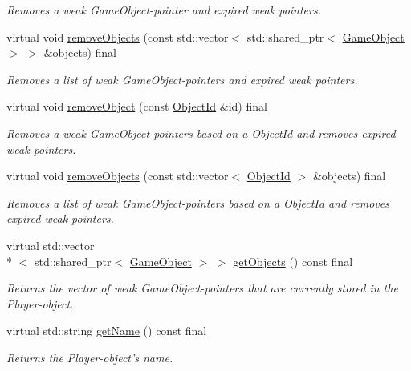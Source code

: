 \begin{DoxyCompactItemize}
\begin{DoxyCompactList}\small\item\em Removes a weak Game\-Object-\/pointer and expired weak pointers. \end{DoxyCompactList}\item 
virtual void \hyperlink{classCourse_1_1PlayerBase_a1ec03fd654d82d9924f77c1a29b80569}{remove\-Objects} (const std\-::vector$<$ std\-::shared\-\_\-ptr$<$ \hyperlink{classCourse_1_1GameObject}{Game\-Object} $>$ $>$ \&objects) final
\begin{DoxyCompactList}\small\item\em Removes a list of weak Game\-Object-\/pointers and expired weak pointers. \end{DoxyCompactList}\item 
virtual void \hyperlink{classCourse_1_1PlayerBase_a98b6f65f5162a34906956852b6382201}{remove\-Object} (const \hyperlink{namespaceCourse_a9a16e743c9813da00109e4991afd2f3e}{Object\-Id} \&id) final
\begin{DoxyCompactList}\small\item\em Removes a weak Game\-Object-\/pointers based on a Object\-Id and removes expired weak pointers. \end{DoxyCompactList}\item 
virtual void \hyperlink{classCourse_1_1PlayerBase_a994b8e326315ed80f18482b32b0d8f3d}{remove\-Objects} (const std\-::vector$<$ \hyperlink{namespaceCourse_a9a16e743c9813da00109e4991afd2f3e}{Object\-Id} $>$ \&objects) final
\begin{DoxyCompactList}\small\item\em Removes a list of weak Game\-Object-\/pointers based on a Object\-Id and removes expired weak pointers. \end{DoxyCompactList}\item 
virtual std\-::vector\\*
$<$ std\-::shared\-\_\-ptr$<$ \hyperlink{classCourse_1_1GameObject}{Game\-Object} $>$ $>$ \hyperlink{classCourse_1_1PlayerBase_ad7ab46149c53b6b8b01a43e721ad11b9}{get\-Objects} () const final
\begin{DoxyCompactList}\small\item\em Returns the vector of weak Game\-Object-\/pointers that are currently stored in the Player-\/object. \end{DoxyCompactList}\item 
virtual std\-::string \hyperlink{classCourse_1_1PlayerBase_ac942dc579051e53d261f60196fd35fee}{get\-Name} () const final
\begin{DoxyCompactList}\small\item\em Returns the Player-\/object's name. \end{DoxyCompactList}\end{DoxyCompactItemize}
